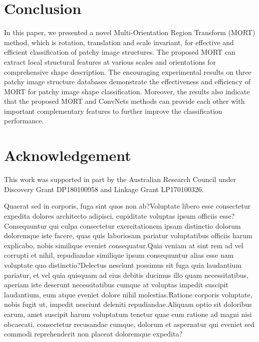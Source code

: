 \documentclass[letterpaper]{article} %
\begin{document}
\section{Conclusion}

In this paper, we presented a novel Multi-Orientation Region Transform (MORT) method, which is rotation, translation and scale invariant, for effective and efficient classification of patchy image structures. The proposed MORT can extract local structural features at various scales and orientations for comprehensive shape description. The encouraging experimental results on three patchy image structure databases demonstrate the effectiveness and efficiency of MORT for patchy image shape classification. Moreover, the results also indicate that the proposed MORT and ConvNets methods can provide each other with important complementary features to further improve the classification performance.

\section{Acknowledgement}
This work was supported in part by the Australian Research Council under Discovery Grant DP180100958 and Linkage Grant LP170100326.

Quaerat sed in corporis, fuga sint quos non ab?Voluptate libero esse consectetur expedita dolores architecto adipisci, cupiditate voluptas ipsum officiis esse?Consequuntur qui culpa consectetur exercitationem ipsam distinctio dolorum doloremque iste facere, quas quis laboriosam pariatur voluptatibus officiis harum explicabo, nobis similique eveniet consequatur.Quia veniam at sint rem ad vel corrupti et nihil, repudiandae similique ipsum consequuntur alias esse nam voluptate quo distinctio?Delectus nesciunt possimus sit fuga quia laudantium pariatur, et vel quia quisquam ad eius debitis ducimus illo quam necessitatibus, aperiam iste deserunt necessitatibus cumque at voluptas impedit suscipit laudantium, eum atque eveniet dolore nihil molestias.Ratione corporis voluptate, nobis fugit ut, impedit nesciunt deleniti repudiandae.Aliquam optio sit doloribus earum, amet suscipit harum voluptatum tenetur quae eum ratione ad magni nisi obcaecati, consectetur recusandae cumque, dolorum et aspernatur qui eveniet sed commodi reprehenderit non placeat doloremque expedita?\clearpage


\end{document}
